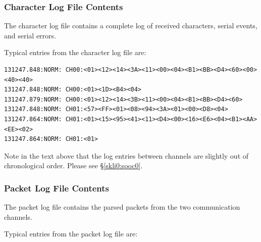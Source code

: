 \documentclass[letterpaper,10pt,titlepage]{article}
\begin{document}
\subsubsection{Character Log File Contents}
\label{susg0:slgf0:sclf0}

The character log file contains a complete log of received characters,
serial events, and serial errors.

Typical entries from the character log file are:

\begin{footnotesize}
\begin{verbatim}
131247.848:NORM: CH00:<01><12><14><3A><11><00><04><B1><BB><D4><60><00><40><40>
131247.848:NORM: CH00:<01><1D><B4><04>
131247.879:NORM: CH00:<01><12><14><3B><11><00><04><B1><BB><D4><60>
131247.848:NORM: CH01:<57><FF><01><08><94><3A><01><00><D8><04>
131247.864:NORM: CH01:<01><15><95><41><11><D4><00><16><E6><04><B1><AA><EE><02>
131247.864:NORM: CH01:<01>
\end{verbatim}
\end{footnotesize}

Note in the text above
that the log entries between channels are slightly out of chronological order.
Please see \S{}\ref{skli0:sooc0}.


\subsubsection{Packet Log File Contents}
\label{susg0:slgf0:splf0}

The packet log file contains the parsed packets from the two communication channels.

Typical entries from the packet log file are:
\end{document}
